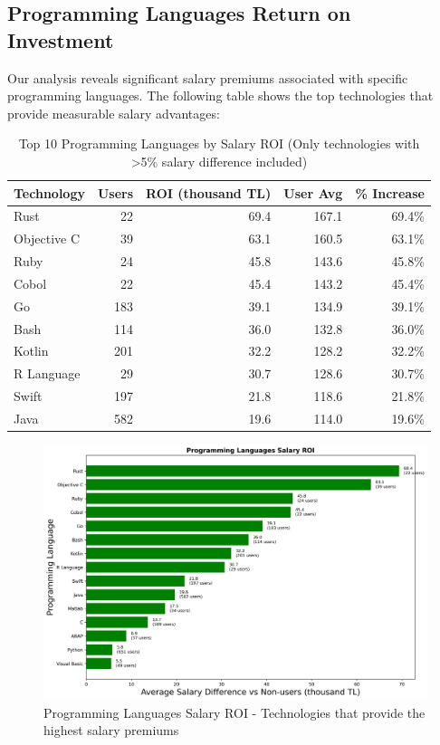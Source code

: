 \documentclass[12pt,a4paper]{article}
\begin{document}
\subsection{Programming Languages Return on Investment}
Our analysis reveals significant salary premiums associated with specific programming languages. The following table shows the top technologies that provide measurable salary advantages:

\begin{table}[H]
\centering
\begin{tabular}{lrrrr}
\toprule
\textbf{Technology} & \textbf{Users} & \textbf{ROI (thousand TL)} & \textbf{User Avg} & \textbf{\% Increase} \\
\midrule
Rust & 22 & 69.4 & 167.1 & 69.4\% \\
Objective C & 39 & 63.1 & 160.5 & 63.1\% \\
Ruby & 24 & 45.8 & 143.6 & 45.8\% \\
Cobol & 22 & 45.4 & 143.2 & 45.4\% \\
Go & 183 & 39.1 & 134.9 & 39.1\% \\
Bash & 114 & 36.0 & 132.8 & 36.0\% \\
Kotlin & 201 & 32.2 & 128.2 & 32.2\% \\
R Language & 29 & 30.7 & 128.6 & 30.7\% \\
Swift & 197 & 21.8 & 118.6 & 21.8\% \\
Java & 582 & 19.6 & 114.0 & 19.6\% \\

\bottomrule
\end{tabular}
\caption{Top 10 Programming Languages by Salary ROI (Only technologies with >5\% salary difference included)}
\end{table}

\begin{figure}[H]
    \centering
    \includegraphics[width=\textwidth]{figures/barplot_programming_roi.png}
    \caption{Programming Languages Salary ROI - Technologies that provide the highest salary premiums}
\end{figure}
\end{document}
